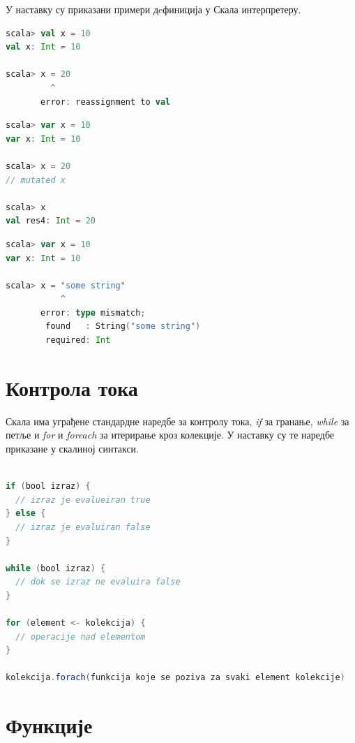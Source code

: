 \documentclass[12pt,oneside]{memoir}
\begin{document}
У наставку су приказани примери дeфиниција у Скала интерпретеру.

\begin{lstlisting}[language=Scala]
scala> val x = 10
val x: Int = 10

scala> x = 20
         ^
       error: reassignment to val
\end{lstlisting}

\begin{lstlisting}[language=Scala]
scala> var x = 10
var x: Int = 10

scala> x = 20
// mutated x

scala> x
val res4: Int = 20

\end{lstlisting}

\begin{lstlisting}[language=Scala]
scala> var x = 10
var x: Int = 10

scala> x = "some string"
           ^
       error: type mismatch;
        found   : String("some string")
        required: Int
\end{lstlisting}

\section{Контрола тока}
\label{sec:scala_kontr_toka}

Скала има уграђене стандардне наредбе за контролу тока, \textit{if} за гранање, \textit{while} за петље и \textit{for} и \textit{foreach} за итерирање кроз колекције. У наставку су те наредбе приказане у скалиној синтакси. \cite{scala_prog}

\begin{lstlisting}[language=Scala]

if (bool izraz) {
  // izraz je evalueiran true
} else {
  // izraz je evaluiran false
}

while (bool izraz) {
  // dok se izraz ne evaluira false
}

for (element <- kolekcija) {
  // operacije nad elementom
}

kolekcija.forach(funkcija koje se poziva za svaki element kolekcije)

\end{lstlisting}

\section{Функције}
\label{sec:scala_funk}
\end{document}
